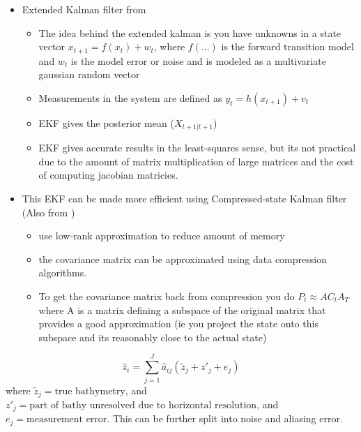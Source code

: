 \begin{itemize}
      \item  Extended Kalman filter from \parencite{Ghorbanidehno2019}
       \begin{itemize}
            \item The idea behind the extended kalman is you have unknowns in a state vector $x_{t+1} = f(x_t) + w_t$, where $f(...)$ is the forward transition model and $w_t$ is the model error or noise and is modeled as a multivariate gaussian random vector 
            \item Measurements in the system are defined as $y_t = h(x_{t+1}) + v_t$
            \item EKF gives the posterior mean ($X_{t+1 | t+1}$)
            \item EKF gives accurate results in the least-squares sense, but its not practical due to the amount of matrix multiplication of large matrices and the cost of computing jacobian matricies.
      \end{itemize}
      \item This EKF can be made more efficient using Compressed-state Kalman filter (Also from \parencite{Ghorbanidehno2019})
      \begin{itemize}
            \item use low-rank approximation to reduce amount of memory
            \item the covariance matrix can be approximated using data compression algorithms.
            \item To get the covariance matrix back from compression you do $P_t \approx A C_t A_T$ where A is a matrix defining a subspace of the original matrix that provides a good approximation (ie you project the state onto this subspace and its reasonably close to the actual state)

      \end{itemize}
\end{itemize}


\color{blue}
\begin{equation}
      \hat{z}_i = \sum_{j=1}^{J}{\hat{a}_{ij}} (\tilde{z}_j + {z'}_j+e_j)
\end{equation}
where $\tilde{z}_j = \text{true bathymetry}$, and ${z'}_j = \text{part of bathy unresolved due to horizontal resolution}$, and $e_j = \text{measurement error}$. This can be further split into noise and aliasing error. \parencite{Plant2002}
\color{black}